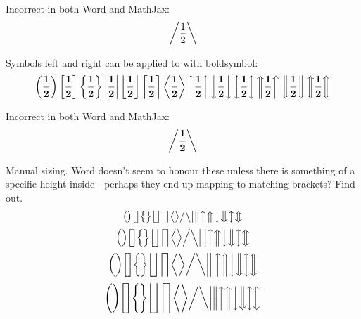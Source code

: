 \documentclass[12pt,a4paper]{article}
\theoremstyle{clearprint}
\begin{document}
Incorrect in both Word and MathJax:
\begin{equation}
\left/ \frac{1}{2} \right\backslash 
\end{equation}

\noindent 
Symbols left and right can be applied to with boldsymbol:
\begin{equation}
\boldsymbol{\left( \frac{1}{2} \right) \left[ \frac{1}{2} \right] \left\{ \frac{1}{2} \right\} \left| \frac{1}{2} \right| \left\lfloor \frac{1}{2} \right\rfloor \left\lceil \frac{1}{2} \right\rceil \left\langle \frac{1}{2} \right\rangle \left\uparrow \frac{1}{2} \right\uparrow \left\downarrow \frac{1}{2} \right\downarrow \left\updownarrow \frac{1}{2} \right\updownarrow \left\Uparrow \frac{1}{2} \right\Uparrow \left\Downarrow \frac{1}{2} \right\Downarrow \left\Updownarrow \frac{1}{2} \right\Updownarrow }  
\end{equation}

Incorrect in both Word and MathJax:
\begin{equation}
\boldsymbol{\left/ \frac{1}{2} \right\backslash} 
\end{equation}

Manual sizing. Word doesn't seem to honour these unless there is something of a specific height inside - perhaps they end up mapping to matching brackets? Find out.
\begin{equation}
\big( \big) \big[ \big] \big\{ \big\} \big\lfloor \big\rfloor \big\lceil \big\rceil \big\langle \big\rangle 
\big/ \big\backslash \big| \big\| \big\uparrow \big\Uparrow \big\downarrow \big\Downarrow \big\updownarrow \big\Updownarrow
\end{equation}
\begin{equation}
\Big( \Big) \Big[ \Big] \Big\{ \Big\} \Big\lfloor \Big\rfloor \Big\lceil \Big\rceil \Big\langle \Big\rangle 
\Big/ \Big\backslash \Big| \Big\| \Big\uparrow \Big\Uparrow \Big\downarrow \Big\Downarrow \Big\updownarrow \Big\Updownarrow
\end{equation}
\begin{equation}
\bigg( \bigg) \bigg[ \bigg] \bigg\{ \bigg\} \bigg\lfloor \bigg\rfloor \bigg\lceil \bigg\rceil \bigg\langle \bigg\rangle 
\bigg/ \bigg\backslash \bigg| \bigg\| \bigg\uparrow \bigg\Uparrow \bigg\downarrow \bigg\Downarrow \bigg\updownarrow \bigg\Updownarrow
\end{equation}
\begin{equation}
\Bigg( \Bigg) \Bigg[ \Bigg] \Bigg\{ \Bigg\} \Bigg\lfloor \Bigg\rfloor \Bigg\lceil \Bigg\rceil \Bigg\langle \Bigg\rangle 
\bigg/ \bigg\backslash \bigg| \bigg\| \bigg\uparrow \bigg\Uparrow \bigg\downarrow \bigg\Downarrow \bigg\updownarrow \bigg\Updownarrow
\end{equation}
\end{document}
